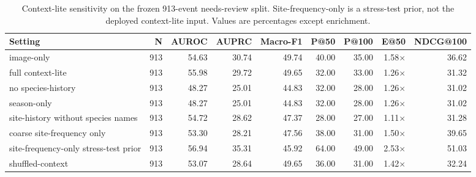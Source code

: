 \begin{table}[h]
\centering
\caption{Context-lite sensitivity on the frozen 913-event needs-review split. Site-frequency-only is a stress-test prior, not the deployed context-lite input. Values are percentages except enrichment.}
\label{tab:context_sensitivity}
\scriptsize
\setlength{\tabcolsep}{3pt}
\begin{tabular}{lrrrrrrrr}
\toprule
Setting & N & AUROC & AUPRC & Macro-F1 & P@50 & P@100 & E@50 & NDCG@100 \\
\midrule
image-only & 913 & 54.63 & 30.74 & 49.74 & 40.00 & 35.00 & 1.58$\times$ & 36.62 \\
full context-lite & 913 & 55.98 & 29.72 & 49.65 & 32.00 & 33.00 & 1.26$\times$ & 31.32 \\
no species-history & 913 & 48.27 & 25.01 & 44.83 & 32.00 & 28.00 & 1.26$\times$ & 31.02 \\
season-only & 913 & 48.27 & 25.01 & 44.83 & 32.00 & 28.00 & 1.26$\times$ & 31.02 \\
site-history without species names & 913 & 54.72 & 28.62 & 47.37 & 28.00 & 27.00 & 1.11$\times$ & 31.28 \\
coarse site-frequency only & 913 & 53.30 & 28.21 & 47.56 & 38.00 & 31.00 & 1.50$\times$ & 39.65 \\
site-frequency-only stress-test prior & 913 & 56.94 & 35.31 & 45.92 & 64.00 & 49.00 & 2.53$\times$ & 51.03 \\
shuffled-context & 913 & 53.07 & 28.64 & 49.65 & 36.00 & 31.00 & 1.42$\times$ & 32.24 \\
\bottomrule
\end{tabular}
\end{table}

